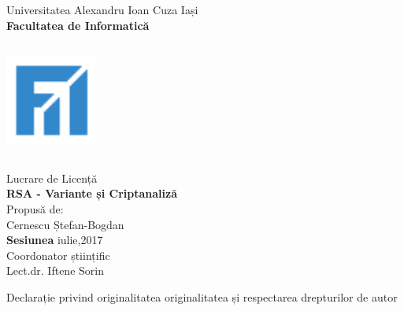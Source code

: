 \documentclass[12pt, oneside]{book}
\begin{document}
\begin{titlepage}
\begin{center}
\vspace*{1cm}
{\Huge Universitatea Alexandru Ioan Cuza Iași} \\
\vspace{0.5cm}
{\huge \textbf{Facultatea de Informatică}} \\
\vspace{1.5cm}
\includegraphics[width=3cm,height=4.5cm,keepaspectratio]{logo_fii3.png} \\
\vspace{1cm}
Lucrare de Licență \\ 
\vspace{0.5cm}
{\Large \textbf{RSA - Variante și Criptanaliză}} \\
\vspace{1cm}
{ \small Propusă de: \\}
{\large Cernescu Ștefan-Bogdan} \\
\vspace{1cm}
{\Large \textbf{Sesiunea} iulie,2017} \\
\vspace{1cm}
{\small Coordonator științific} \\
{\large Lect.dr. Iftene Sorin}
\end{center}
\end{titlepage}

\vspace{1cm}
{ \Huge \center Declarație privind originalitatea originalitatea și respectarea drepturilor de autor} \\
\end{document}
